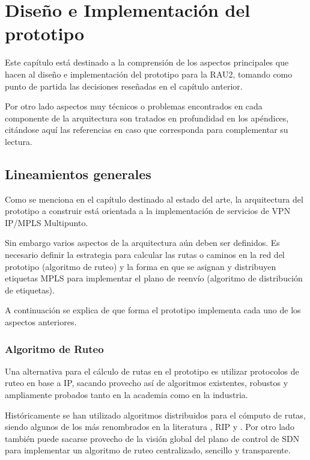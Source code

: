 \chapter{Dise\~no e Implementaci\'on del prototipo}

\ifpdf
    \graphicspath{{Chapter4/Figs/Raster/}{Chapter4/Figs/PDF/}{Chapter4/Figs/}}
\else
    \graphicspath{{Chapter4/Figs/Vector/}{Chapter4/Figs/}}
\fi

Este cap\'itulo est\'a destinado a la comprensi\'on de los aspectos principales que hacen al dise\~no e implementaci\'on del prototipo para la RAU2, tomando como punto de partida las decisiones reseñadas en el cap\'itulo anterior.

Por otro lado aspectos muy t\'ecnicos o problemas encontrados en cada componente de la arquitectura son tratados en profundidad en los ap\'endices, citándose aquí las referencias en caso que corresponda para complementar su lectura.

\section[Lineamientos generales]{Lineamientos generales}

Como se menciona en el cap\'itulo destinado al estado del arte, la arquitectura del prototipo a construir est\'a orientada a la implementaci\'on de servicios de VPN IP/MPLS Multipunto.

Sin embargo varios aspectos de la arquitectura a\'un deben ser definidos. Es necesario definir la estrategia para calcular las rutas o caminos en la red del prototipo (algoritmo de ruteo) y la forma en que se asignan y distribuyen etiquetas MPLS para implementar el plano de reenvío (algoritmo de distribución de etiquetas). 

A continuaci\'on se explica de que forma el prototipo implementa cada uno de los aspectos anteriores.

\subsection{Algoritmo de Ruteo}

Una alternativa para el c\'alculo de rutas en el prototipo es utilizar protocolos de ruteo en base a IP, sacando provecho as\'i de algoritmos existentes, robustos y ampliamente probados tanto en la academia como en la industria.

Hist\'oricamente se han utilizado algoritmos distribuidos para el c\'omputo de rutas, siendo algunos de los m\'as renombrados en la literatura \cite{moy1998rfc}, RIP\cite{malkin1994rip} y \cite{routingprotocol}. Por otro lado también puede sacarse provecho de la visi\'on global del plano de control de SDN para implementar un algoritmo de ruteo centralizado, sencillo y transparente.

